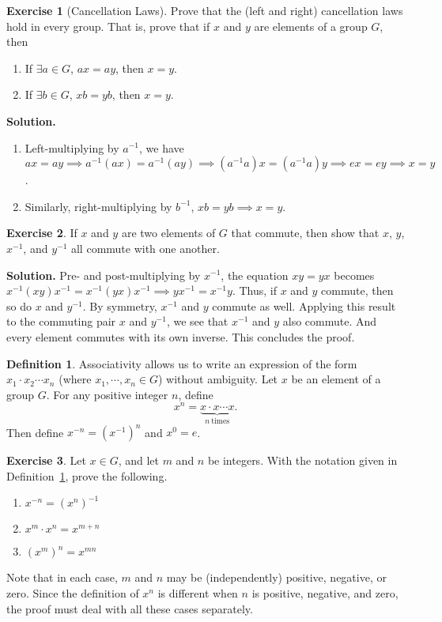 \documentclass[svgnames]{article}
\theoremstyle{definition}
\newtheorem{Definition}[Theorem]{Definition}
\newtheorem{Exercise}{Exercise}[section]
\theoremstyle{remark}
\begin{document}
\begin{Exercise}[Cancellation Laws]
Prove that the (left and right) cancellation laws hold in every group. That is, prove that if $x$ and $y$ are elements of a group $G$, then
\begin{enumerate}
\item If $\exists a \in G$, $ax = ay$, then $x = y$.
\item If $\exists b \in G$, $xb = yb$, then $x = y$.
\end{enumerate}
\textbf{Solution.} \begin{enumerate}
\item Left-multiplying by $a^{-1}$, we have $ax = ay \implies a^{-1}(ax) = a^{-1}(ay) \implies (a^{-1}a)x = (a^{-1}a)y \implies ex = ey \implies x = y$.
\item Similarly, right-multiplying by $b^{-1}$, $xb = yb \implies x = y$.
\end{enumerate}
\end{Exercise}

\begin{Exercise}
If $x$ and $y$ are two elements of $G$ that commute, then show that $x$, $y$, $x^{-1}$, and $y^{-1}$ all commute with one another.

\textbf{Solution.} Pre- and post-multiplying by $x^{-1}$, the equation $xy = yx$ becomes $x^{-1}(xy)x^{-1} = x^{-1}(yx)x^{-1} \implies yx^{-1} = x^{-1}y$. Thus, if $x$ and $y$ commute, then so do $x$ and $y^{-1}$. By symmetry, $x^{-1}$ and $y$ commute as well. Applying this result to the commuting pair $x$ and $y^{-1}$, we see that $x^{-1}$ and $y$ also commute. And every element commutes with its own inverse. This concludes the proof.
\end{Exercise}

\begin{Definition}\label{def:Power}
Associativity allows us to write an expression of the form $x_1 \cdot x_2 \cdots x_n$ (where $x_1, \cdots, x_n \in G$) without ambiguity. Let $x$ be an element of a group $G$. For any positive integer $n$, define
\begin{equation*}
x^n = \underbrace{x \cdot x \cdots x}_{n\ \text{times}}.
\end{equation*}
Then define $x^{-n} = (x^{-1})^n$ and $x^0 = e$.

\end{Definition}
\begin{Exercise}
Let $x \in G$, and let $m$ and $n$ be integers. With the notation given in Definition~\ref{def:Power}, prove the following.
\begin{enumerate}
\item $x^{-n} = (x^n)^{-1}$
\item $x^m \cdot x^n = x^{m + n}$
\item $(x^m)^n = x^{mn}$
\end{enumerate}
Note that in each case, $m$ and $n$ may be (independently) positive, negative, or zero. Since the definition of $x^n$ is different when $n$ is positive, negative, and zero, the proof must deal with all these cases separately.
\end{Exercise}
\end{document}
